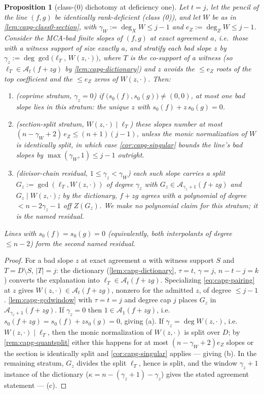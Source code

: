 \documentclass[11pt]{article}
\newtheorem{proposition}[proposition]{Proposition}
\theoremstyle{definition}
\theoremstyle{remark}
\begin{document}
\begin{proposition}[class-(0) dichotomy at deficiency one]\label{prop:capg-class0}
Let $t=j$, let the pencil of the line $(f,g)$ be identically rank-deficient
(class (0)), and let $W$ be as in \cref{lem:capg-class0-section}, with
$\gamma_W:=\deg_XW\leq j-1$ and $e_Z:=\deg_ZW\leq j-1$.  Consider the
MCA-bad finite slopes of $(f,g)$ at exact agreement $a$, i.e.\ those with a
witness support of size exactly $a$, and stratify each bad slope $z$ by
$\gamma_z:=\deg\gcd\big(\ell_{T},\,W(z,\cdot)\big)$, where $T$ is the
co-support of a witness (so $\ell_T\in\mathcal{A}_t(f+zg)$ by
\cref{lem:capg-dictionary}) and $z$ avoids the $\leq e_Z$ roots of the top
coefficient and the $\leq e_Z$ zeros of $W(z,\cdot)$.  Then:
\begin{enumerate}[label=(\alph*)]
\item (\emph{coprime stratum, $\gamma_z=0$}) if
$\big(s_0(f),s_0(g)\big)\neq(0,0)$, at most one bad slope lies in this
stratum: the unique $z$ with $s_0(f)+z\,s_0(g)=0$.
\item (\emph{section-split stratum, $W(z,\cdot)\mid\ell_T$}) these slopes
number at most $(n-\gamma_W+2)\,e_Z\leq (n+1)(j-1)$, unless the monic
normalization of $W$ is identically split, in which case
\cref{cor:capg-singular} bounds the line's bad slopes by
$\max(\gamma_W,1)\leq j-1$ outright.
\item (\emph{divisor-chain residual, $1\leq\gamma_z<\gamma_W$}) each such
slope carries a split $G_z:=\gcd(\ell_T,W(z,\cdot))$ of degree $\gamma_z$
with $G_z\in\mathcal{A}_{\gamma_z+1}(f+zg)$ and $G_z\mid W(z,\cdot)$; by the
dictionary, $f+zg$ agrees with a polynomial of degree $<n-2\gamma_z-1$ off
$Z(G_z)$.  We make no polynomial claim for this stratum; it is the named
residual.
\end{enumerate}
Lines with $s_0(f)=s_0(g)=0$ (equivalently, both interpolants of degree
$\leq n-2$) form the second named residual.
\end{proposition}

\begin{proof}
For a bad slope $z$ at exact agreement $a$ with witness support $S$ and
$T=D\setminus S$, $|T|=j$: the dictionary (\cref{lem:capg-dictionary},
$\tau=t$, $\gamma=j$, $n-t-j=k$) converts the explanation into
$\ell_T\in\mathcal{A}_t(f+zg)$.  Specializing \eqref{eq:capg-pairing} at $z$
gives $W(z,\cdot)\in\mathcal{A}_t(f+zg)$, nonzero for the admitted $z$, of
degree $\leq j-1$.  \cref{lem:capg-gcdwindow} with $\tau=t=j$ and degree cap
$j$ places $G_z$ in $\mathcal{A}_{\gamma_z+1}(f+zg)$.  If $\gamma_z=0$ then
$1\in\mathcal{A}_1(f+zg)$, i.e.\ $s_0(f+zg)=s_0(f)+zs_0(g)=0$, giving (a).
If $\gamma_z=\deg W(z,\cdot)$, i.e.\ $W(z,\cdot)\mid\ell_T$, then the monic
normalization of $W(z,\cdot)$ is split over $D$; by
\cref{rem:capg-quantsplit} either this happens for at most
$(n-\gamma_W+2)e_Z$ slopes or the section is identically split and
\cref{cor:capg-singular} applies --- giving (b).  In the remaining stratum,
$G_z$ divides the split $\ell_T$, hence is split, and the window
$\gamma_z+1$ instance of the dictionary ($\kappa=n-(\gamma_z+1)-\gamma_z$)
gives the stated agreement statement --- (c).
\end{proof}
\end{document}
